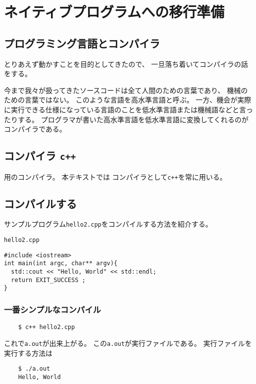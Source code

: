  \section{ネイティブプログラムへの移行準備}

 \subsection{プログラミング言語とコンパイラ}
 とりあえず動かすことを目的としてきたので、
 一旦落ち着いてコンパイラの話をする。

 今まで我々が扱ってきたソースコードは全て人間のための言葉であり、
 機械のための言葉ではない。
 このような言語を高水準言語と呼ぶ。
 一方、機会が実際に実行できる仕様になっている言語のことを低水準言語または機械語などと言ったりする。
 プログラマが書いた高水準言語を低水準言語に変換してくれるのがコンパイラである。
 
 
  \subsection{コンパイラ \texttt{c++}}
  \Cpp 用のコンパイラ。
  本テキストでは コンパイラとして\texttt{c++}を常に用いる。
  
  
  \subsection{コンパイルする}
  
  サンプルプログラム\texttt{hello2.cpp}をコンパイルする方法を紹介する。
  \begin{itembox}{\texttt{hello2.cpp}}
\begin{verbatim}
#include <iostream>
int main(int argc, char** argv){
  std::cout << "Hello, World" << std::endl;
  return EXIT_SUCCESS ;
}
\end{verbatim}
  \end{itembox}
   
   
   \subsubsection*{一番シンプルなコンパイル}
   \begin{verbatim}
	$ c++ hello2.cpp
   \end{verbatim}
   これで\texttt{a.out}が出来上がる。
   この\texttt{a.out}が実行ファイルである。
   実行ファイルを実行する方法は
   \begin{verbatim}
	$ ./a.out
	Hello, World
   \end{verbatim}
   

